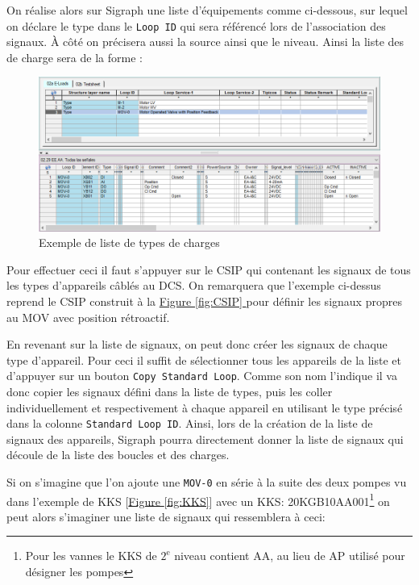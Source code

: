 \documentclass[11pt, openright]{book}
\begin{document}
On réalise alors sur Sigraph une liste d'équipements comme ci-dessous, sur lequel on déclare le type dans le \texttt{Loop ID} qui sera référencé lors de l'association des signaux. À côté on précisera aussi la source ainsi que le niveau. Ainsi la liste des de charge sera de la forme :


\begin{figure}[ht!]
    \centering
    \includegraphics[width=\textwidth]{./object/Sigraph2.png}
    \caption{Exemple de liste de types de charges}
    \label{fig:Sigraph2}
\end{figure}

Pour effectuer ceci il faut s'appuyer sur le CSIP qui contenant les signaux de tous les types d'appareils câblés au DCS. On remarquera que l'exemple ci-dessus reprend le CSIP construit à la \hyperref[fig:CSIP]{Figure \ref{fig:CSIP} } pour définir les signaux propres au MOV avec position rétroactif.

En revenant sur la liste de signaux, on peut donc créer les signaux de chaque type d'appareil. Pour ceci il suffit de sélectionner tous les appareils de la liste et d'appuyer sur un bouton \texttt{Copy Standard Loop}. Comme son nom l'indique il va donc copier les signaux défini dans la liste de types, puis les coller individuellement et respectivement à chaque appareil en utilisant le type précisé dans la colonne \texttt{Standard Loop ID}. Ainsi, lors de la création de la liste de signaux des appareils, Sigraph pourra directement donner la liste de signaux qui découle de la liste des boucles et des charges.

Si on s'imagine que l'on ajoute une \texttt{MOV-0} en série à la suite des deux pompes vu dans l'exemple de KKS [\hyperref[fig:KKS]{Figure \ref{fig:KKS}}] avec un KKS: 20KGB10AA001\footnote{Pour les vannes le KKS de $2^{\text{e}}$ niveau contient AA, au lieu de AP utilisé pour désigner les pompes} on peut alors s'imaginer une liste de signaux qui ressemblera à ceci:
\end{document}
